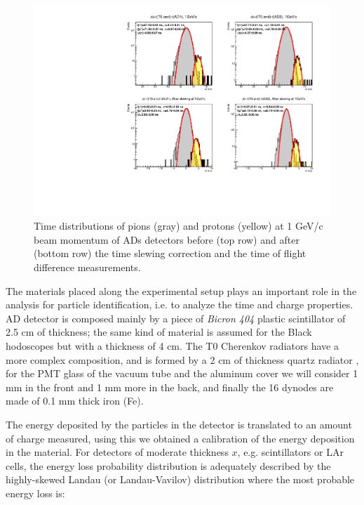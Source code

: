 		\begin{figure}[h!]
			\begin{center}
				\includegraphics[scale=0.70]{./images/time/1GeV/NoteSlewH1.pdf}%
				\caption{Time distributions of pions (gray) and protons (yellow) at 1 GeV/c beam momentum of ADs detectors before (top row) and
					after (bottom row) the time slewing correction and the time of flight difference	 measurements.}
				\label{figure:Time_1GeV}
			\end{center}
		\end{figure}
	
	The materials placed along the experimental setup plays an important role in the analysis for particle 
	identification, i.e. to analyze the time and charge properties. AD detector is composed mainly by a piece of
	\textit{Bicron 404} \cite{BC404_Manual} plastic scintillator of 2.5 cm of thickness; the same kind of material
	is assumed for the Black hodoscopes but with a thickness of 4 cm. The T0 Cherenkov radiators have a more
	complex composition, and is formed by a 2 cm of thickness quartz radiator \cite{T0detector}, for the PMT glass
	of the vacuum tube and the aluminum cover we will consider 1 mm in the front and 1 mm more in the back, and
	finally the 16 dynodes are made of 0.1 mm thick iron (Fe).
	
	The energy deposited by the particles in the detector is translated to an amount of charge measured, using
	this we obtained a calibration of the energy deposition in the material. %
	For detectors of moderate thickness $x$, e.g. scintillators or LAr cells, the energy loss probability 
	distribution is adequately described by the highly-skewed Landau (or Landau-Vavilov) distribution 
	\cite{ReviewPDG, Grupen} where the most probable energy loss is:
	
